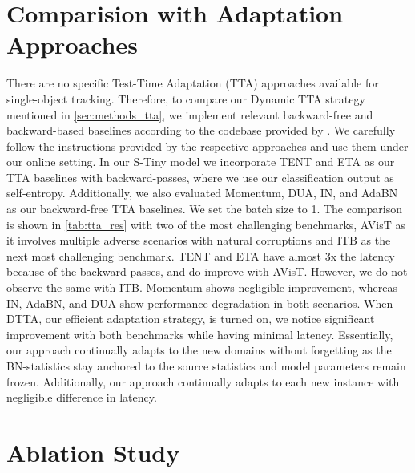   \section{Comparision with Adaptation Approaches}\label{sec:tta_res}
  There are no specific Test-Time Adaptation (TTA) approaches available for single-object tracking. Therefore, to compare our Dynamic TTA strategy mentioned in \ref{sec:methods_tta}, we implement relevant backward-free and backward-based baselines according to the codebase provided by \cite{alfarra2023revisiting}. We carefully follow the instructions provided by the respective approaches and use them under our online setting. 
  In our S-Tiny model we incorporate TENT\cite{wang2020tent} and ETA\cite{niu2022efficient} as our TTA baselines with backward-passes,
  where we use our classification output as self-entropy. Additionally, we also evaluated Momentum\cite{schneider2020improving}, DUA\cite{mirza2022norm}, IN\cite{pan2018two}, and AdaBN\cite{li2016revisiting} as our backward-free TTA baselines. We set the batch size to 1. The comparison is shown in \ref{tab:tta_res} with two of the most challenging benchmarks, AVisT as it involves multiple adverse scenarios with natural corruptions and ITB as the next most challenging benchmark.
  TENT and ETA have almost 3x the latency because of the backward passes, and do improve with AVisT. However, we do not observe the same with ITB. Momentum shows negligible improvement, whereas IN, AdaBN, and DUA show performance degradation in both scenarios. When DTTA, our efficient adaptation strategy, is turned on, we notice significant improvement with both benchmarks while having minimal latency. Essentially, our approach continually adapts to the new domains without forgetting as the BN-statistics stay anchored to the source statistics and model parameters remain frozen. Additionally, our approach continually adapts to each new instance with negligible difference in latency.

  
  \section{Ablation Study}\label{sec:ablation}
  
  
  
